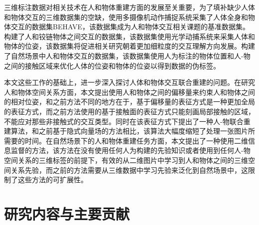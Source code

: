 三维标注数据对相关技术在人和物体重建方面的发展至关重要，为了填补缺少人体和物体交互的三维数据集的空缺，\citet{Bhatnagar_2022_CVPR:BEHAVE}使用多摄像机动作捕捉系统采集了人体全身和物体交互的数据集BEHAVE，该数据集成为人和物体交互相关课题的基准数据集。\citet{Jiang2022FullBodyAH}构建了人和铰链物体之间交互的数据集，该数据集使用光学动捕系统来采集人体和物体的位姿，该数据集将促进相关研究朝着更加细粒度的交互理解方向发展。\citet{yang2023lemon}构建了自然场景中人和物体交互的数据集，该数据集使用人为标注的物体位置和人-物之间的接触区域来优化人体的位姿和物体的位姿以得到数据的伪标签。

本文这些工作的基础上，进一步深入探讨人体和物体交互联合重建的问题。在研究人和物体空间关系方面，本文提出使用人和物体之间的偏移量来约束人和物体之间的相对位姿，和之前方法不同的地方在于，基于偏移量的表征方式是一种更加全局的表征方式，而之前方法使用的基于接触面的表征方式只能刻画局部接触的区域，不能应对那些非接触式的交互类型。同时在该表征方式下提出了一种人-物联合重建算法，和之前基于隐式向量场的方法相比，该算法大幅度缩短了处理一张图片所需要的时间。在自然场景下的人和物体重建任务方面，本文提出了一种使用二维信息监督的方法，该方法在没有使用任何人为构建的先验知识或者使用到任何人-物空间关系的三维标签的前提下，有效的从二维图片中学习到人和物体之间的三维空间关系先验，而之前的方法需要从三维数据中学习先验来泛化到自然场景中，这限制了这些方法的可扩展性。

\clearpage

\section{研究内容与主要贡献}

